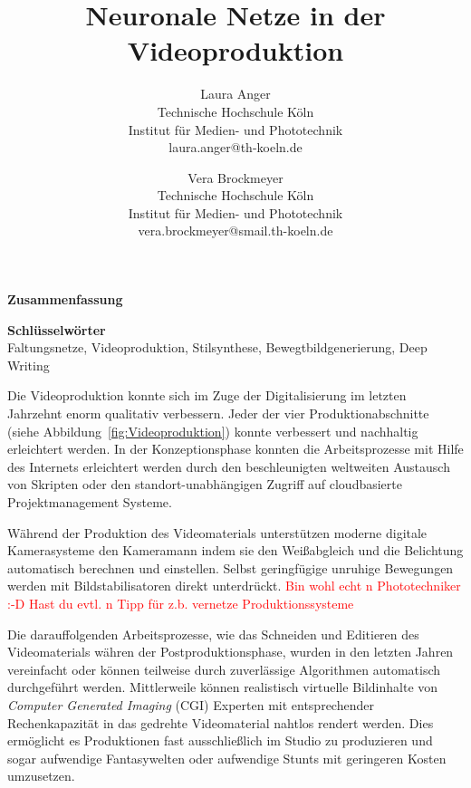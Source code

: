 \documentclass[times, 11pt,twocolumn]{article}
\begin{document}
\title{Neuronale Netze in der Videoproduktion}

\author{Laura Anger\\
Technische Hochschule K\"oln \\ Institut f\"ur Medien- und Phototechnik \\  laura.anger@th-koeln.de \\
\and
Vera Brockmeyer\\
Technische Hochschule K\"oln \\ Institut f\"ur Medien- und Phototechnik \\ vera.brockmeyer@smail.th-koeln.de \\
}

\maketitle
\thispagestyle{empty}


\large{\textbf{Zusammenfassung}}\\ \small %
{} 

\large{\textbf{Schl\"usselw\"orter}}\\ \small %
 Faltungsnetze, Videoproduktion, Stilsynthese, Bewegtbildgenerierung, Deep Writing


 \label{sec:Einleitung}
Die Videoproduktion konnte sich im Zuge der Digitalisierung im letzten Jahrzehnt enorm qualitativ verbessern. Jeder der vier Produktionabschnitte (siehe Abbildung~\ref{fig:Videoproduktion}) konnte verbessert und nachhaltig erleichtert werden. In der Konzeptionsphase konnten die Arbeitsprozesse mit Hilfe des Internets erleichtert werden durch den beschleunigten weltweiten Austausch von Skripten oder den standort-unabhängigen Zugriff auf cloudbasierte Projektmanagement Systeme.

Während der Produktion des Videomaterials unterstützen moderne digitale Kamerasysteme den Kameramann indem sie den Weißabgleich und die Belichtung automatisch berechnen und einstellen. Selbst geringfügige unruhige Bewegungen werden mit Bildstabilisatoren direkt unterdrückt.  \textcolor{red}{Bin wohl echt n Phototechniker :-D Hast du evtl. n Tipp für z.b. vernetze Produktionssysteme}

Die darauffolgenden Arbeitsprozesse, wie das Schneiden und Editieren des Videomaterials währen der Postproduktionsphase, wurden in den letzten Jahren vereinfacht oder können teilweise durch zuverlässige Algorithmen automatisch durchgeführt werden. Mittlerweile können realistisch virtuelle Bildinhalte von \textit{Computer Generated Imaging} (CGI) Experten mit entsprechender Rechenkapazität in das gedrehte Videomaterial nahtlos rendert werden. Dies ermöglicht es Produktionen fast ausschließlich im Studio zu produzieren und sogar aufwendige Fantasywelten oder aufwendige Stunts mit geringeren Kosten umzusetzen.
\end{document}
